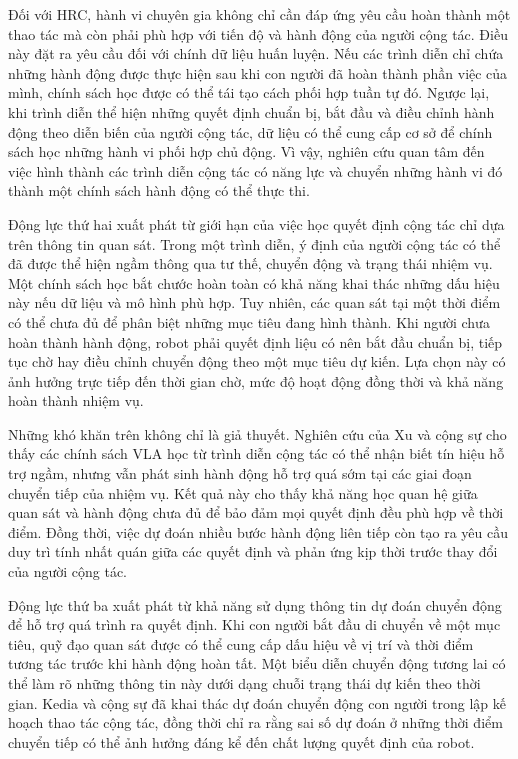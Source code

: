 Đối với HRC, hành vi chuyên gia không chỉ cần đáp ứng yêu cầu hoàn thành một thao tác mà còn phải phù hợp với tiến độ và hành động của người cộng tác. Điều này đặt ra yêu cầu đối với chính dữ liệu huấn luyện. Nếu các trình diễn chỉ chứa những hành động được thực hiện sau khi con người đã hoàn thành phần việc của mình, chính sách học được có thể tái tạo cách phối hợp tuần tự đó. Ngược lại, khi trình diễn thể hiện những quyết định chuẩn bị, bắt đầu và điều chỉnh hành động theo diễn biến của người cộng tác, dữ liệu có thể cung cấp cơ sở để chính sách học những hành vi phối hợp chủ động. Vì vậy, nghiên cứu quan tâm đến việc hình thành các trình diễn cộng tác có năng lực và chuyển những hành vi đó thành một chính sách hành động có thể thực thi.

Động lực thứ hai xuất phát từ giới hạn của việc học quyết định cộng tác chỉ dựa trên thông tin quan sát. Trong một trình diễn, ý định của người cộng tác có thể đã được thể hiện ngầm thông qua tư thế, chuyển động và trạng thái nhiệm vụ. Một chính sách học bắt chước hoàn toàn có khả năng khai thác những dấu hiệu này nếu dữ liệu và mô hình phù hợp. Tuy nhiên, các quan sát tại một thời điểm có thể chưa đủ để phân biệt những mục tiêu đang hình thành. Khi người chưa hoàn thành hành động, robot phải quyết định liệu có nên bắt đầu chuẩn bị, tiếp tục chờ hay điều chỉnh chuyển động theo một mục tiêu dự kiến. Lựa chọn này có ảnh hưởng trực tiếp đến thời gian chờ, mức độ hoạt động đồng thời và khả năng hoàn thành nhiệm vụ.

Những khó khăn trên không chỉ là giả thuyết. Nghiên cứu của Xu và cộng sự \cite{xu2026learningtoassist} cho thấy các chính sách VLA học từ trình diễn cộng tác có thể nhận biết tín hiệu hỗ trợ ngầm, nhưng vẫn phát sinh hành động hỗ trợ quá sớm tại các giai đoạn chuyển tiếp của nhiệm vụ. Kết quả này cho thấy khả năng học quan hệ giữa quan sát và hành động chưa đủ để bảo đảm mọi quyết định đều phù hợp về thời điểm. Đồng thời, việc dự đoán nhiều bước hành động liên tiếp còn tạo ra yêu cầu duy trì tính nhất quán giữa các quyết định và phản ứng kịp thời trước thay đổi của người cộng tác.

Động lực thứ ba xuất phát từ khả năng sử dụng thông tin dự đoán chuyển động để hỗ trợ quá trình ra quyết định. Khi con người bắt đầu di chuyển về một mục tiêu, quỹ đạo quan sát được có thể cung cấp dấu hiệu về vị trí và thời điểm tương tác trước khi hành động hoàn tất. Một biểu diễn chuyển động tương lai có thể làm rõ những thông tin này dưới dạng chuỗi trạng thái dự kiến theo thời gian. Kedia và cộng sự \cite{kedia2023manicastcollaborative} đã khai thác dự đoán chuyển động con người trong lập kế hoạch thao tác cộng tác, đồng thời chỉ ra rằng sai số dự đoán ở những thời điểm chuyển tiếp có thể ảnh hưởng đáng kể đến chất lượng quyết định của robot.

